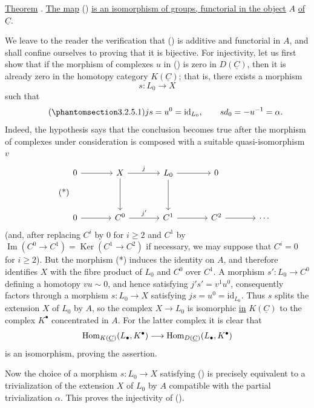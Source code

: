\underline{Theorem} . \underline{The map} ()
\underline{is an isomorphism of groups, functorial in the object}
$A$ \underline{of} $\underline C$.

We leave to the reader the verification that () is additive and
functorial in $A$, and shall confine ourselves to proving that it is
bijective. For injectivity, let us first show that if the morphism of
complexes $u$ in () is zero in $D(\underline C)$, then it is
already zero in the homotopy category $K(\underline C)$; that is,
there exists a morphism
\[
 s:L_0\longrightarrow X
\]
such that
\begin{equation}\tag{\SGARefTarget{sga7.sga7i.evii.n3-2-5-1}{3.2.5.1}}
 js=u^0=\mathrm{id}_{L_0},
 \qquad sd_0=-u^{-1}=\alpha.
\end{equation}
Indeed, the hypothesis says that the conclusion becomes true after
the morphism of complexes under consideration is composed with a
suitable quasi-isomorphism $v$
\begin{equation}\tag{*}
\begin{tikzcd}[column sep=large,row sep=huge]
 0\arrow[r] & X\arrow[r,"j"]\arrow[d]
 & L_0\arrow[r]\arrow[d] & 0\\
 0\arrow[r] & C^0\arrow[r,"j'"] & C^1\arrow[r] & C^2\arrow[r] & \cdots
\end{tikzcd}
\end{equation}
(and, after replacing $C^i$ by $0$ for $i\geq2$ and $C^1$ by
$\operatorname{Im}(C^0\longrightarrow C^1)
=\operatorname{Ker}(C^1\longrightarrow C^2)$ if necessary, we may
suppose that $C^i=0$ for $i\geq2$). But the morphism (*) induces the
identity on $A$, and therefore identifies $X$ with the fibre product
of $L_0$ and $C^0$ over $C^1$. A morphism
$s':L_0\longrightarrow C^0$ defining a homotopy $vu\sim0$, and hence
satisfying $j's'=v^1u^0$, consequently factors through a morphism
$s:L_0\longrightarrow X$ satisfying
$js=u^0=\mathrm{id}_{L_0}$. Thus $s$ splits the extension $X$ of
$L_0$ by $A$, so the complex $X\longrightarrow L_0$ is isomorphic
\underline{in} $K(\underline C)$ to the complex $K^\bullet$
concentrated in $A$. For the latter complex it is clear that
\[
 \Hom_{K(\underline C)}(L_\bullet,K^\bullet)
 \longrightarrow
 \Hom_{D(\underline C)}(L_\bullet,K^\bullet)
\]
is an isomorphism, proving the assertion.

Now the choice of a morphism $s:L_0\longrightarrow X$ satisfying
() is precisely equivalent to a trivialization of the
extension $X$ of $L_0$ by $A$ compatible with the partial
trivialization $\alpha$. This proves the injectivity of ().


